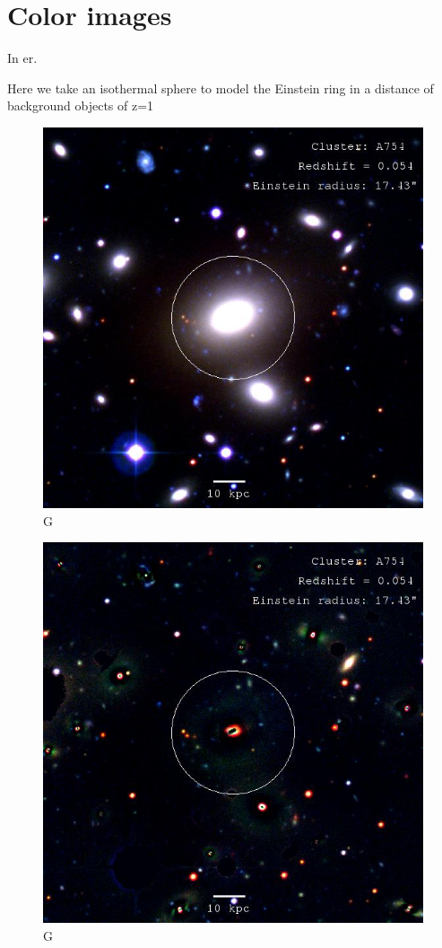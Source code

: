 \section{Color images}


In er.  

Here we take an isothermal sphere to model the Einstein ring in a distance of background objects of z=1

\begin{figure}[H]
\centering
\includegraphics[width=12cm]{images/cA754.jpg}
\caption[M]{G}
\end{figure}

\begin{figure}[H]
\centering
\includegraphics[width=12cm]{images/cA754_galfit.jpg}
\caption[M]{G}
\end{figure}


